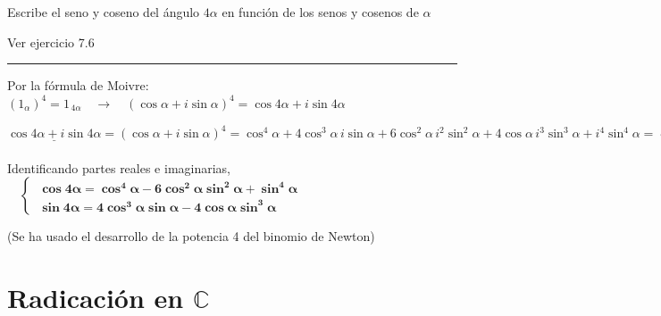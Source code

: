 \begin{miejercicio}

Escribe el seno y coseno del ángulo $4\alpha$ en función de los senos y cosenos de $\alpha$

\vspace{2mm} \textcolor{gris}{ Ver ejercicio 7.6 }

\rule{250pt}{0.5pt}

\vspace{2mm} Por la fórmula de Moivre: $(1_\alpha)^4=1_{\, 4\alpha} \quad \to \quad (\cos \alpha+i\sin \alpha)^4=\cos 4\alpha+i\sin 4\alpha$

\vspace{2mm}$\underline{ \cos 4\alpha+i\sin 4\alpha }= (\cos \alpha+i\sin \alpha)^4 = \cos^4 \alpha + 4 \cos^3 \alpha \, i \sin \alpha + 6 \cos^2 \alpha \, i^2 \sin^2 \alpha + 4 \cos \alpha \, i^3 \sin^3 \alpha + i^4 \sin^4 \alpha=\cos^4 \alpha + 4 \cos^3 \alpha \, i \sin \alpha - 6 \cos^2 \alpha  \sin^2 \alpha - 4 \cos \alpha \, i \sin^3 \alpha +  \sin^4 \alpha= \underline{(\, \cos^4 \alpha -6\cos^2 \alpha \sin^2 \alpha +\sin^4 \alpha \, ) \ + \ i\, (\, 4\cos^3 \alpha \sin \alpha -4\cos \alpha \sin^3 \alpha \, )}$

\vspace{2mm} Identificando partes reales e imaginarias, $\quad \begin{cases}
 \ \boldsymbol{ \cos 4\alpha = \cos^4 \alpha -6\cos^2 \alpha \sin^2 \alpha +\sin^4 \alpha } \\ \ \boldsymbol{ \sin 4\alpha =  4\cos^3 \alpha \sin \alpha -4\cos \alpha \sin^3 \alpha } \end{cases}$
 
 \vspace{2mm} \textcolor{gris}{(Se ha usado el desarrollo de la potencia 4 del binomio de Newton)}

	
\end{miejercicio}


\vspace{1cm}
\section{Radicación en $\mathbb C$}
\vspace{0.5cm}



